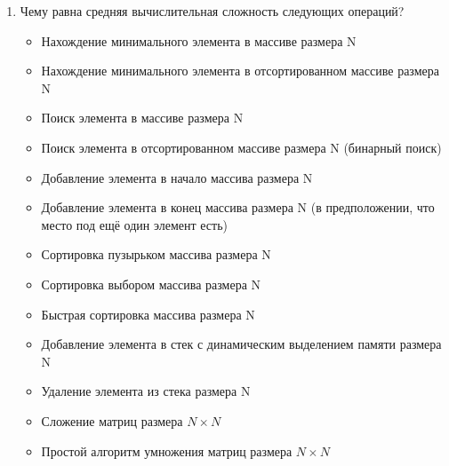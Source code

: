 \documentclass{article}
\begin{document}
\begin{enumerate}
\item \textbf{} Чему равна средняя вычислительная сложность следующих операций?
\begin{itemize}
\item Нахождение минимального элемента в массиве размера N
\item Нахождение минимального элемента в отсортированном массиве размера N
\item Поиск элемента в массиве размера N
\item Поиск элемента в отсортированном массиве размера N (бинарный поиск)
\item Добавление элемента в начало массива размера N
\item Добавление элемента в конец массива размера N (в предположении, что место под ещё один элемент есть)
\item Сортировка пузырьком массива размера N
\item Сортировка выбором массива размера N
\item Быстрая сортировка массива размера N
\item Добавление элемента в стек с динамическим выделением памяти размера N
\item Удаление элемента из стека размера N
\item Сложение матриц размера  $N \times N$
\item Простой алгоритм умножения матриц размера  $N \times N$
\end{itemize}
\end{enumerate}

\newpage
\end{document}
